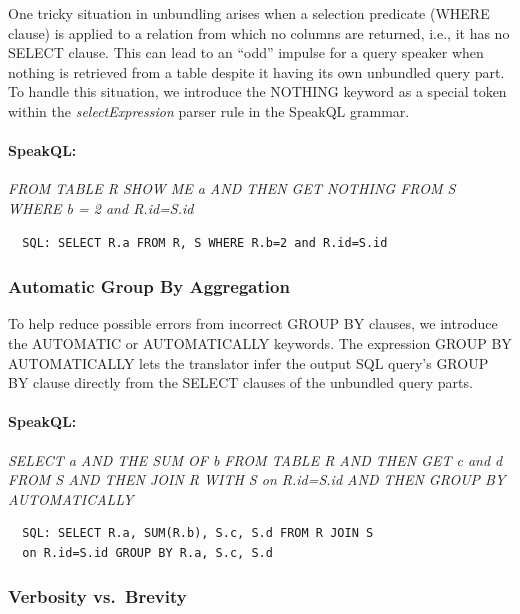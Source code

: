 One tricky situation in unbundling arises when a selection predicate (WHERE clause) is applied to a relation from which no columns are returned, i.e., it has no SELECT clause. 
This can lead to an ``odd'' impulse for a query speaker when nothing is retrieved from a table despite it having its own unbundled query part. 
To handle this situation, we introduce the NOTHING keyword as a special token within the \emph{selectExpression} parser rule in the SpeakQL grammar. 


\paragraph{SpeakQL:} \emph{FROM TABLE R SHOW ME a AND THEN GET NOTHING FROM S WHERE b = 2 and R.id=S.id}

\vspace{2mm}
\begin{verbatim}
  SQL: SELECT R.a FROM R, S WHERE R.b=2 and R.id=S.id
\end{verbatim}


\vspace{1mm}
\subsubsection{\textbf{Automatic Group By Aggregation}}

To help reduce possible errors from incorrect GROUP BY clauses, we introduce the AUTOMATIC or AUTOMATICALLY keywords. 
The expression GROUP BY AUTOMATICALLY lets the translator infer the output SQL query's GROUP BY clause directly from the SELECT clauses of the unbundled query parts.

\paragraph{SpeakQL:} \emph{SELECT a AND THE SUM OF b FROM TABLE R AND THEN GET c and d FROM S AND THEN JOIN R WITH S on R.id=S.id AND THEN GROUP BY AUTOMATICALLY}

\vspace{2mm}
\begin{verbatim}
  SQL: SELECT R.a, SUM(R.b), S.c, S.d FROM R JOIN S
  on R.id=S.id GROUP BY R.a, S.c, S.d
\end{verbatim}


\vspace{1mm}
\subsubsection{\textbf{Verbosity vs.~Brevity}} 

